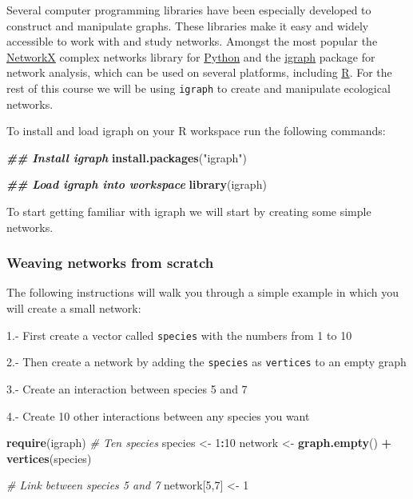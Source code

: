 \documentclass[
]{article}
\newenvironment{Shaded}{\begin{snugshade}}{\end{snugshade}}
\newcommand{\CommentTok}[1]{\textcolor[rgb]{0.56,0.35,0.01}{\textit{#1}}}
\newcommand{\DecValTok}[1]{\textcolor[rgb]{0.00,0.00,0.81}{#1}}
\newcommand{\DocumentationTok}[1]{\textcolor[rgb]{0.56,0.35,0.01}{\textbf{\textit{#1}}}}
\newcommand{\FunctionTok}[1]{\textcolor[rgb]{0.13,0.29,0.53}{\textbf{#1}}}
\newcommand{\NormalTok}[1]{#1}
\newcommand{\OtherTok}[1]{\textcolor[rgb]{0.56,0.35,0.01}{#1}}
\newcommand{\SpecialCharTok}[1]{\textcolor[rgb]{0.81,0.36,0.00}{\textbf{#1}}}
\newcommand{\StringTok}[1]{\textcolor[rgb]{0.31,0.60,0.02}{#1}}
\begin{document}
Several computer programming libraries have been especially developed to
construct and manipulate graphs. These libraries make it easy and widely
accessible to work with and study networks. Amongst the most popular the
\href{https://networkx.github.io/}{NetworkX} complex networks library
for \href{https://www.python.org/}{Python} and the
\href{https://igraph.org/}{igraph} package for network analysis, which
can be used on several platforms, including
\href{https://www.r-project.org/}{R}. For the rest of this course we
will be using \texttt{igraph} to create and manipulate ecological
networks.

To install and load igraph on your R workspace run the following
commands:

\begin{Shaded}
\begin{Highlighting}[]
\DocumentationTok{\#\# Install igraph}
\FunctionTok{install.packages}\NormalTok{(}\StringTok{"igraph"}\NormalTok{)}

\DocumentationTok{\#\# Load igraph into workspace}
\FunctionTok{library}\NormalTok{(igraph)}
\end{Highlighting}
\end{Shaded}

To start getting familiar with igraph we will start by creating some
simple networks.

\subsubsection{Weaving networks from
scratch}\label{weaving-networks-from-scratch}

The following instructions will walk you through a simple example in
which you will create a small network:

1.- First create a vector called \texttt{species} with the numbers from
1 to 10

2.- Then create a network by adding the \texttt{species} as
\texttt{vertices} to an empty graph

3.- Create an interaction between species 5 and 7

4.- Create 10 other interactions between any species you want

\begin{Shaded}
\begin{Highlighting}[]
\FunctionTok{require}\NormalTok{(igraph)}
\CommentTok{\# Ten species}
\NormalTok{species }\OtherTok{\textless{}{-}} \DecValTok{1}\SpecialCharTok{:}\DecValTok{10}
\NormalTok{network }\OtherTok{\textless{}{-}} \FunctionTok{graph.empty}\NormalTok{() }\SpecialCharTok{+} \FunctionTok{vertices}\NormalTok{(species)}

\CommentTok{\# Link between species 5 and 7}
\NormalTok{network[}\DecValTok{5}\NormalTok{,}\DecValTok{7}\NormalTok{] }\OtherTok{\textless{}{-}} \DecValTok{1}
\end{Highlighting}
\end{Shaded}
\end{document}
